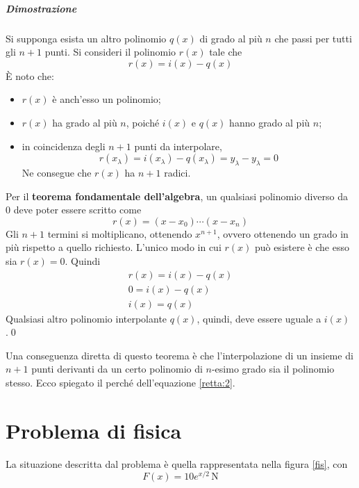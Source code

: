 \paragraph{Dimostrazione} Si supponga esista un altro polinomio $q(x)$ di grado al più $n$ che passi per tutti gli $n+1$ punti. Si consideri il polinomio $r(x)$ tale che
\[
r(x)=i(x)-q(x)
\]
È noto che:
\begin{itemize}
\item $r(x)$ è anch'esso un polinomio;
\item $r(x)$ ha grado al più $n$, poiché $i(x)$ e $q(x)$ hanno grado al più $n$;
\item in coincidenza degli $n+1$ punti da interpolare,
\[r(x_\lambda)=i(x_\lambda)-q(x_\lambda)=y_\lambda-y_\lambda=0\]
Ne consegue che $r(x)$ ha $n+1$ radici.
\end{itemize}
Per il \textbf{teorema fondamentale dell'algebra}, un qualsiasi polinomio diverso da 0 deve poter essere scritto come 
\[
r(x)=(x-x_0)\cdots(x-x_n)
\]
Gli $n+1$ termini si moltiplicano, ottenendo $x^{n+1}$, ovvero ottenendo un grado in più rispetto a quello richiesto. L'unico modo in cui $r(x)$ può esistere è che esso sia $r(x)=0$.
Quindi
\begin{gather*}
r(x)=i(x)-q(x)\\
0=i(x)-q(x)\\
i(x)=q(x)
\end{gather*}
Qualsiasi altro polinomio interpolante $q(x)$, quindi, deve essere uguale a $i(x)$.\qed

Una conseguenza diretta di questo teorema è che l'interpolazione di un insieme di $n+1$ punti derivanti da un certo polinomio di $n$-esimo grado sia il polinomio stesso.
Ecco spiegato il perché dell'equazione \eqref{retta:2}.

\chapter{Problema di fisica}

La situazione descritta dal problema è quella rappresentata nella figura \ref{fis}, con
\[F(x)=10e^{x/2}\,\text{N}\]

\begin{figure}
\end{figure}

